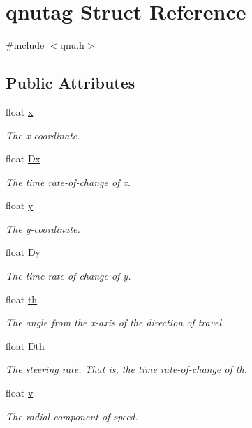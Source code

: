\hypertarget{structqnutag}{\section{qnutag Struct Reference}
\label{structqnutag}
}


{\ttfamily \#include $<$qnu.\-h$>$}

\subsection*{Public Attributes}
\begin{DoxyCompactItemize}
\item 
float \hyperlink{structqnutag_a32ef71f6513fa30bd13b1d005642b93b}{x}
\begin{DoxyCompactList}\small\item\em The x-\/coordinate. \end{DoxyCompactList}\item 
float \hyperlink{structqnutag_aa55459cb3394a42b386db8789f18abb8}{Dx}
\begin{DoxyCompactList}\small\item\em The time rate-\/of-\/change of x. \end{DoxyCompactList}\item 
float \hyperlink{structqnutag_a1bdb6dfd08730c13494c9300a09028fa}{y}
\begin{DoxyCompactList}\small\item\em The y-\/coordinate. \end{DoxyCompactList}\item 
float \hyperlink{structqnutag_a93e69167497d2354c752ce6327652983}{Dy}
\begin{DoxyCompactList}\small\item\em The time rate-\/of-\/change of y. \end{DoxyCompactList}\item 
float \hyperlink{structqnutag_a94e6da5d70df2be6f958b180decd55c7}{th}
\begin{DoxyCompactList}\small\item\em The angle from the x-\/axis of the direction of travel. \end{DoxyCompactList}\item 
float \hyperlink{structqnutag_ae73c10936a907938a3d0c90e7966b37b}{Dth}
\begin{DoxyCompactList}\small\item\em The steering rate. That is, the time rate-\/of-\/change of th. \end{DoxyCompactList}\item 
float \hyperlink{structqnutag_a98c6a8196d4f9ea5f718938beb02bfb0}{v}
\begin{DoxyCompactList}\small\item\em The radial component of speed. \end{DoxyCompactList}\end{DoxyCompactItemize}


